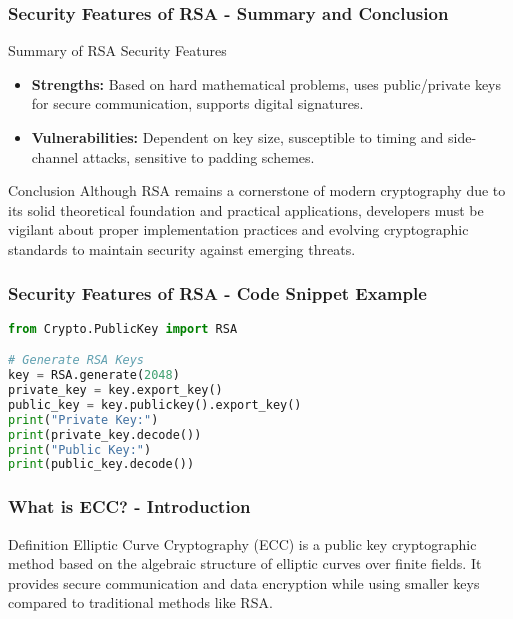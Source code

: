 \documentclass{beamer}
\begin{document}
\begin{frame}[fragile]
    \frametitle{Security Features of RSA - Summary and Conclusion}
    \begin{block}{Summary of RSA Security Features}
        \begin{itemize}
            \item \textbf{Strengths:} Based on hard mathematical problems, uses public/private keys for secure communication, supports digital signatures.
            \item \textbf{Vulnerabilities:} Dependent on key size, susceptible to timing and side-channel attacks, sensitive to padding schemes.
        \end{itemize}
    \end{block}
    
    \begin{block}{Conclusion}
        Although RSA remains a cornerstone of modern cryptography due to its solid theoretical foundation and practical applications, developers must be vigilant about proper implementation practices and evolving cryptographic standards to maintain security against emerging threats.
    \end{block}
\end{frame}

\begin{frame}[fragile]
    \frametitle{Security Features of RSA - Code Snippet Example}
    \begin{lstlisting}[language=Python]
from Crypto.PublicKey import RSA

# Generate RSA Keys
key = RSA.generate(2048)
private_key = key.export_key()
public_key = key.publickey().export_key()
print("Private Key:")
print(private_key.decode())
print("Public Key:")
print(public_key.decode())
    \end{lstlisting}
\end{frame}

\begin{frame}[fragile]
    \frametitle{What is ECC? - Introduction}
    \begin{block}{Definition}
        Elliptic Curve Cryptography (ECC) is a public key cryptographic method based on the algebraic structure of elliptic curves over finite fields. It provides secure communication and data encryption while using smaller keys compared to traditional methods like RSA.
    \end{block}
\end{frame}
\end{document}
